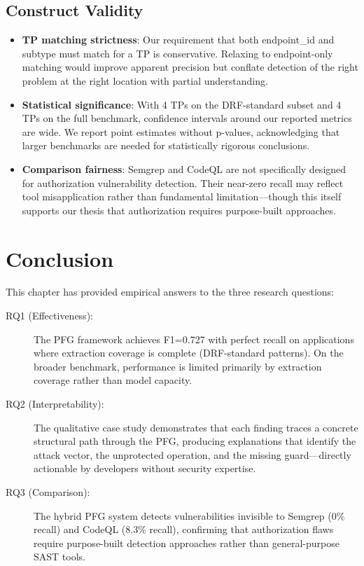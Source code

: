 \subsection{Construct Validity}

\begin{itemize}
    \item \textbf{TP matching strictness}: Our requirement that both endpoint\_id and subtype must match for a TP is conservative. Relaxing to endpoint-only matching would improve apparent precision but conflate detection of the right problem at the right location with partial understanding.

    \item \textbf{Statistical significance}: With 4 TPs on the DRF-standard subset and 4 TPs on the full benchmark, confidence intervals around our reported metrics are wide. We report point estimates without p-values, acknowledging that larger benchmarks are needed for statistically rigorous conclusions.

    \item \textbf{Comparison fairness}: Semgrep and CodeQL are not specifically designed for authorization vulnerability detection. Their near-zero recall may reflect tool misapplication rather than fundamental limitation—though this itself supports our thesis that authorization requires purpose-built approaches.
\end{itemize}

\section{Conclusion}
\label{sec:ch5-conclusion}

This chapter has provided empirical answers to the three research questions:

\begin{description}
    \item[RQ1 (Effectiveness):] The PFG framework achieves F1=0.727 with perfect recall on applications where extraction coverage is complete (DRF-standard patterns). On the broader benchmark, performance is limited primarily by extraction coverage rather than model capacity.

    \item[RQ2 (Interpretability):] The qualitative case study demonstrates that each finding traces a concrete structural path through the PFG, producing explanations that identify the attack vector, the unprotected operation, and the missing guard—directly actionable by developers without security expertise.

    \item[RQ3 (Comparison):] The hybrid PFG system detects vulnerabilities invisible to Semgrep (0\% recall) and CodeQL (8.3\% recall), confirming that authorization flaws require purpose-built detection approaches rather than general-purpose SAST tools.
\end{description}

